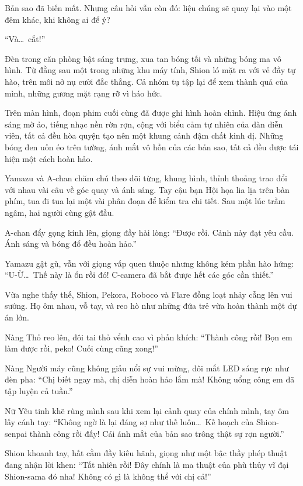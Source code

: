 \documentclass[../main.tex]{subfiles}
\begin{document}
Bản sao đã biến mất. Nhưng câu hỏi vẫn còn đó: liệu chúng sẽ quay lại vào một đêm khác, khi không ai để ý?

\omk

``Và\dots\ cắt!''

Đèn trong căn phòng bật sáng trưng, xua tan bóng tối và những bóng ma vô hình. Từ đằng sau một trong những khu máy tính, Shion ló mặt ra với vẻ đầy tự hào, trên môi nở nụ cười đắc thắng. Cả nhóm tụ tập lại để xem thành quả của mình, những gương mặt rạng rỡ vì háo hức.

Trên màn hình, đoạn phim cuối cùng đã được ghi hình hoàn chỉnh. Hiệu ứng ánh sáng mờ ảo, tiếng nhạc nền rờn rợn, cộng với biểu cảm tự nhiên của dàn diễn viên, tất cả đều hòa quyện tạo nên một khung cảnh đậm chất kinh dị. Những bóng đen uốn éo trên tường, ánh mắt vô hồn của các bản sao, tất cả đều được tái hiện một cách hoàn hảo.

Yamazu và A-chan chăm chú theo dõi từng, khung hình, thỉnh thoảng trao đổi với nhau vài câu về góc quay và ánh sáng. Tay cậu bạn Hội họa lia lịa trên bàn phím, tua đi tua lại một vài phân đoạn để kiểm tra chi tiết. Sau một lúc trầm ngâm, hai người cùng gật đầu.

A-chan đẩy gọng kính lên, giọng đầy hài lòng: ``Được rồi. Cảnh này đạt yêu cầu. Ánh sáng và bóng đổ đều hoàn hảo.''

Yamazu gật gù, vẫn với giọng vấp quen thuộc nhưng không kém phần hào hứng: ``U-Ừ\dots\ Thế này là ổn rồi đó! C-camera đã bắt được hết các góc cần thiết.''

Vừa nghe thấy thế, Shion, Pekora, Roboco và Flare đồng loạt nhảy cẫng lên vui sướng. Họ ôm nhau, vỗ tay, và reo hò như những đứa trẻ vừa hoàn thành một dự án lớn.

Nàng Thỏ reo lên, đôi tai thỏ vểnh cao vì phấn khích: ``Thành công rồi! Bọn em làm được rồi, peko! Cuối cùng cũng xong!''

Nàng Người máy cũng không giấu nổi sự vui mừng, đôi mắt LED sáng rực như đèn pha: ``Chị biết ngay mà, chị diễn hoàn hảo lắm mà! Không uổng công em đã tập luyện cả tuần.''

Nữ Yêu tinh khẽ rùng mình sau khi xem lại cảnh quay của chính mình, tay ôm lấy cánh tay: ``Không ngờ là lại đáng sợ như thế luôn\dots\ Kế hoạch của Shion-senpai thành công rồi đấy! Cái ánh mắt của bản sao trông thật sự rợn người.''

Shion khoanh tay, hất cằm đầy kiêu hãnh, giọng như một bậc thầy phép thuật đang nhận lời khen: ``Tất nhiên rồi! Đây chính là ma thuật của phù thủy vĩ đại Shion-sama đó nha! Không có gì là không thể với chị cả!''
\end{document}
